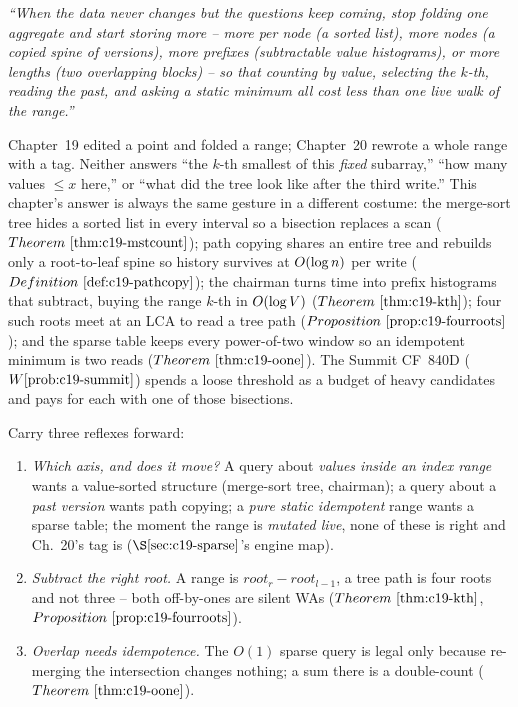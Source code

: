 \begin{lastword}
\emph{``When the data never changes but the questions keep coming, stop folding one
aggregate and start storing more -- more per node (a sorted list), more nodes (a copied
spine of versions), more prefixes (subtractable value histograms), or more lengths (two
overlapping blocks) -- so that counting by value, selecting the \(k\)-th, reading the past,
and asking a static minimum all cost less than one live walk of the range.''}

\medskip
Chapter~19 edited a point and folded a range; Chapter~20 rewrote a whole range with a tag.
Neither answers ``the \(k\)-th smallest of this \emph{fixed} subarray,'' ``how many values
\(\le x\) here,'' or ``what did the tree look like after the third write.'' This chapter's
answer is always the same gesture in a different costume: the merge-sort tree hides a sorted
list in every interval so a bisection replaces a scan (\(\thmref{c19-mstcount}\)); path
copying shares an entire tree and rebuilds only a root-to-leaf spine so history survives at
\(O(\log n)\) per write (\(\defref{c19-pathcopy}\)); the chairman turns time into prefix
histograms that subtract, buying the range \(k\)-th in \(O(\log V)\)
(\(\thmref{c19-kth}\)); four such roots meet at an LCA to read a tree path
(\(\propref{c19-fourroots}\)); and the sparse table keeps every power-of-two window so an
idempotent minimum is two reads (\(\thmref{c19-oone}\)). The Summit CF~840D
(\(\probref{c19-summit}\)) spends a loose threshold as a budget of heavy candidates and pays
for each with one of those bisections.

\medskip
Carry three reflexes forward:
\begin{enumerate}[nosep, leftmargin=1.6em]
  \item \emph{Which axis, and does it move?} A query about \emph{values inside an index range}
        wants a value-sorted structure (merge-sort tree, chairman); a query about a
        \emph{past version} wants path copying; a \emph{pure static idempotent} range wants a
        sparse table; the moment the range is \emph{mutated live}, none of these is right and
        Ch.~20's tag is (\(\secref{c19-sparse}\)'s engine map).
  \item \emph{Subtract the right root.} A range is \(\mathit{root}_r-\mathit{root}_{l-1}\), a
        tree path is four roots and not three -- both off-by-ones are silent WAs
        (\(\thmref{c19-kth}\), \(\propref{c19-fourroots}\)).
  \item \emph{Overlap needs idempotence.} The \(O(1)\) sparse query is legal only because
        re-merging the intersection changes nothing; a sum there is a double-count
        (\(\thmref{c19-oone}\)).
\end{enumerate}


\end{lastword}
